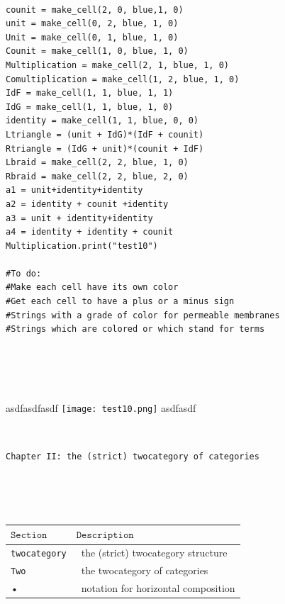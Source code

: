 \documentclass{book}
\newcounter{pcounter}
\begin{document}
\begin{center}
\begin{tcolorbox}[width=5in,colback={white},title={\begin{center}\texttt{Python \thepcounter} \addtocounter{pcounter}{1}  \end{center}},colbacktitle=Red,coltitle=black]
\begin{verbatim}

counit = make_cell(2, 0, blue,1, 0)
unit = make_cell(0, 2, blue, 1, 0)
Unit = make_cell(0, 1, blue, 1, 0)
Counit = make_cell(1, 0, blue, 1, 0)
Multiplication = make_cell(2, 1, blue, 1, 0)
Comultiplication = make_cell(1, 2, blue, 1, 0)
IdF = make_cell(1, 1, blue, 1, 1)
IdG = make_cell(1, 1, blue, 1, 0)
identity = make_cell(1, 1, blue, 0, 0)
Ltriangle = (unit + IdG)*(IdF + counit)
Rtriangle = (IdG + unit)*(counit + IdF)
Lbraid = make_cell(2, 2, blue, 1, 0)
Rbraid = make_cell(2, 2, blue, 2, 0)
a1 = unit+identity+identity
a2 = identity + counit +identity
a3 = unit + identity+identity
a4 = identity + identity + counit
Multiplication.print("test10")

#To do:
#Make each cell have its own color
#Get each cell to have a plus or a minus sign
#Strings with a grade of color for permeable membranes
#Strings which are colored or which stand for terms





\end{verbatim}%
\end{tcolorbox}
\end{center}

\newpage
asdfasdfasdf
\texttt{[image: test10.png]}
asdfasdf

\newpage
\ \


{
\Huge 
\begin{center}
\texttt{Chapter II: the (strict) twocategory of categories}
\end{center}
\thispagestyle{empty}
}

\ \\
\ \\
\ \\

{
\small
\begin{center}
\begin{tabular}{|l | l |} 
 \hline
 $\texttt{Section}$ & $\texttt{Description}$ \\
 \hline
 \hline
 \texttt{twocategory} &\ the (strict) twocategory structure \\
 \hline
 \texttt{Two} &\ the twocategory of categories \\
 \hline
 • &\ notation for horizontal composition \\
 \hline
\end{tabular}
\end{center}
}
\end{document}
